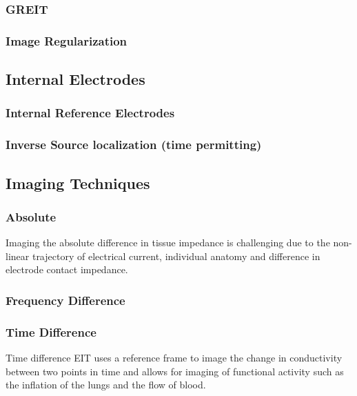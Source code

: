 \subsubsection{GREIT}
\subsubsection{Image Regularization}

\subsection{Internal Electrodes}
\subsubsection{Internal Reference Electrodes}
\subsubsection{Inverse Source localization (time permitting)}


\subsection{Imaging Techniques}


\subsubsection{Absolute}

Imaging the absolute difference in tissue impedance is challenging due to the non-linear trajectory of 
electrical current, individual anatomy and difference in electrode contact impedance. 

\subsubsection{Frequency Difference}

\subsubsection{Time Difference}
Time difference EIT uses a reference frame to image the change in conductivity between 
two points in time and allows for imaging of functional activity such as the inflation of the lungs 
and the flow of blood.






